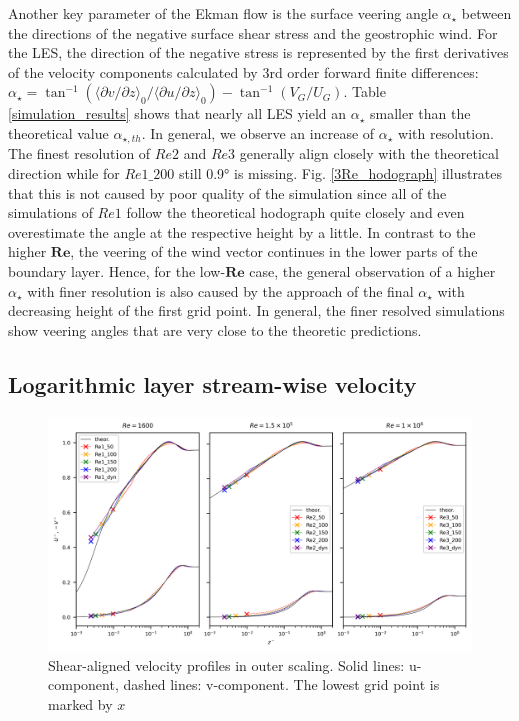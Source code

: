\documentclass[draft,a4paper,11pt]{article}
\newcommand{\RE}{\mathbf{Re}}
\begin{document}
Another key parameter of the Ekman flow is the surface veering angle $\alpha_\star$ between the directions of the negative surface shear stress and the geostrophic wind. For the LES, the direction of the negative stress is represented by the first derivatives of the velocity components calculated by 3rd order forward finite differences: $\alpha_\star = \tan^{-1}(\langle \partial v/\partial z\rangle_0/\langle \partial u/\partial z\rangle_0)-\tan^{-1}(V_G/U_G)$. Table \ref{simulation_results} shows that nearly all LES yield an $\alpha_\star$ smaller than the theoretical value $\alpha_{\star,th}$. In general, we observe an increase of $\alpha_\star$ with resolution. The finest resolution of $Re2$ and $Re3$ generally align closely with the theoretical direction while for $Re1\_200$ still 0.9° is missing. Fig. \ref{3Re_hodograph} illustrates that this is not caused by poor quality of the simulation since all of the simulations of $Re1$ follow the theoretical hodograph quite closely and even overestimate the angle at the respective height by a little. In contrast to the higher $\RE$, the veering of the wind vector continues in the lower parts of the boundary layer. Hence, for the low-$\RE$ case, the general observation of a higher $\alpha_\star$ with finer resolution is also caused by the approach of the final $\alpha_\star$ with decreasing height of the first grid point. In general, the finer resolved simulations show veering angles that are very close to the theoretic predictions.

\subsection{Logarithmic layer stream-wise velocity}
\label{vel_profiles}

\begin{figure}[ht]
  \centerline{
	\includegraphics[width=\textwidth]{figures_2024/d3y_3Re_profiles_outer.png}
	}
  \caption{Shear-aligned velocity profiles in outer scaling. Solid lines: u-component, dashed lines: v-component. The lowest grid point is marked by $x$}
  \label{velocity_outer}
\end{figure}
\end{document}
